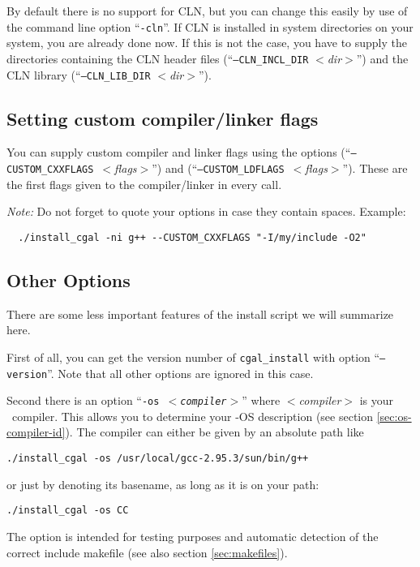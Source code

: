 By default there is no support for CLN, but you can change this easily
by use of the command line option ``\texttt{-cln}''. If CLN is
installed in system directories on your system, you are already done
now. If this is not the case, you have to supply the directories
containing the CLN header files (``\texttt{--CLN\_INCL\_DIR}
\textit{$<$dir$>$}'') and the CLN library
(``\texttt{--CLN\_LIB\_DIR}
\textit{$<$dir$>$}'').

\subsection{Setting custom compiler/linker flags}\label{sec:custom-setup}

You can supply custom compiler and linker flags using the options
\mbox{(``\texttt{--CUSTOM\_CXXFLAGS}
  \textit{$<$flags$>$}'')} and
\mbox{(``\texttt{--CUSTOM\_LDFLAGS}
  \textit{$<$flags$>$}'')}.  These are the
first flags given to the compiler/linker in every call.

\textit{Note:} Do not forget to quote your options in case they
contain spaces. Example:
\begin{verbatim}
  ./install_cgal -ni g++ --CUSTOM_CXXFLAGS "-I/my/include -O2"
\end{verbatim}

\subsection{Other Options}\label{sec:other-options}

There are some less important features of the install script we will
summarize here.

First of all, you can get the version number of \texttt{cgal\_install}
with option ``\texttt{--version}''. Note that all other options are
ignored in this case.

Second there is an option ``\texttt{-os \textit{$<$compiler$>$}}''
where \textit{$<$compiler$>$} is your \CC\ compiler. This allows you
to determine your \cgal-OS description (see section
\ref{sec:os-compiler-id}). The compiler can either be given by an
absolute path like
\begin{verbatim}
./install_cgal -os /usr/local/gcc-2.95.3/sun/bin/g++
\end{verbatim}
or just by denoting its basename, as long as it is on your path:
\begin{verbatim}
./install_cgal -os CC
\end{verbatim}
The option is intended for testing purposes and automatic detection of
the correct include makefile (see also section \ref{sec:makefiles}).

